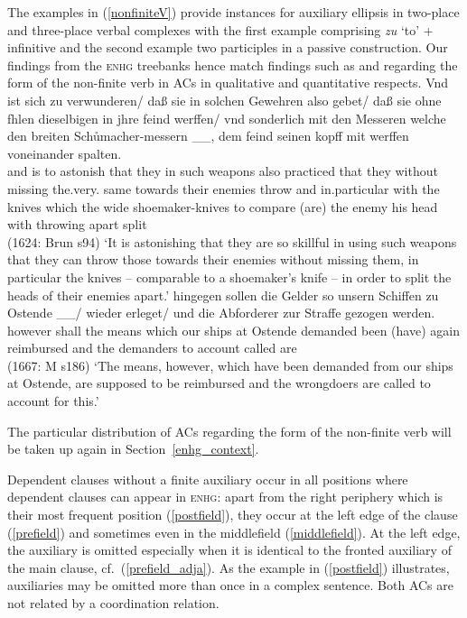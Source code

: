 \documentclass[output=paper,colorlinks,citecolor=brown]{langscibook}
\begin{document}
The examples in (\ref{nonfiniteV}) provide instances for auxiliary ellipsis in two-place and three-place verbal complexes with the first example comprising \textit{zu} `to' + infinitive  and the second example two participles in a passive construction. Our findings from the \textsc{enhg} treebanks hence match findings such as \citet{breitbarth2005} and \citet{thomas2018} regarding the form of the non-finite verb in ACs in qualitative and quantitative respects.
\eal \label{nonfiniteV}
\ex 
\gll Vnd ist sich zu verwunderen/  daß sie in solchen Gewehren also ge\oldue{}bet/  daß sie ohne f\oldae{}hlen dieselbigen in jhre feind werffen/ vnd sonderlich mit den Messeren  welche den breiten Sch\r{u}macher-messern   \_\_, dem feind seinen kopff mit werffen voneinander spalten. \\ and is  to astonish that they in such weapons also practiced that they without missing {the.very. same} towards their enemies throw and {in.particular} with the knives which the wide shoemaker-knives to compare (are) the enemy his head with throwing apart split \\  \hfill (1624: Brun s94)
\glt `It is astonishing that they are so skillful in using such weapons that they can throw those towards their enemies without missing them, in particular the knives -- comparable to a shoemaker's knife -- in order to split the heads of their enemies apart.'
\ex 
\gll hingegen sollen die Gelder so unsern Schiffen zu Ostende   \_\_/ wieder erleget/ und die Abforderer zur Straffe gezogen werden. \\ however shall the means which our ships at Ostende demanded been (have) again reimbursed and the demanders to account called are   \\ \hfill (1667: M s186)
\glt `The means, however, which have been demanded from our ships at Ostende, are supposed to be reimbursed and the wrongdoers are called to account for this.'
\zl

The particular distribution of ACs regarding the form of the non-finite verb will be taken up again in Section~\ref{enhg_context}.

Dependent clauses without a finite auxiliary occur in all positions where dependent clauses can appear in \textsc{enhg}: apart from the right periphery which is their most frequent position (\ref{postfield}), they occur at the left edge of the clause (\ref{prefield}) and sometimes even in the middlefield (\ref{middlefield}). At the left edge, the auxiliary is omitted especially when it is identical to the fronted auxiliary of the main clause, cf.\ (\ref{prefield_adja}). As the example in (\ref{postfield}) illustrates, auxiliaries may be omitted more than once in a complex sentence. Both ACs are not related by a coordination relation. 
\end{document}
